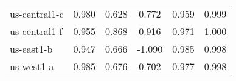 \begin{table}[]
\begin{tabular}{lccccc}
us-central1-c                                    & 0.980                                   & 0.628                           & 0.772                                & 0.959                                                                                    & 0.999                                                                             \\
us-central1-f                                    & 0.955                                   & 0.868                           & 0.916                                & 0.971                                                                                    & 1.000                                                                             \\
us-east1-b                                       & 0.947                                   & 0.666                           & -1.090                               & 0.985                                                                                    & 0.998                                                                             \\
us-west1-a                                       & 0.985                                   & 0.676                           & 0.702                                & 0.977                                                                                    & 0.998                                                                            
\end{tabular}
\end{table}